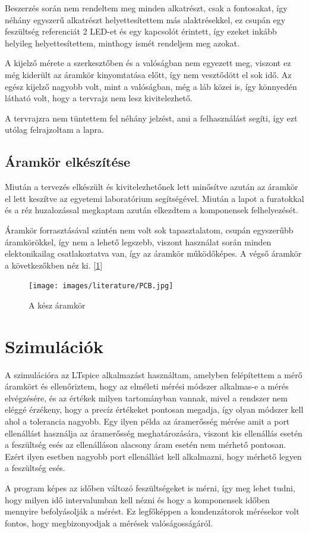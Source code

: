 Beszerzés során nem rendeltem meg minden alkatrészt, csak a fontosakat, így néhány
egyszerű alkatrészt helyettesítettem más alaktrésekkel, ez csupán egy feszültség referenciát
2 LED-et és egy kapcsolót érintett, így ezeket inkább helyileg helyettesítettem, minthogy
ismét rendeljem meg azokat.

A kijelző mérete a szerkesztőben és a valóságban nem egyezett meg, viszont ez még 
kiderült az áramkör kinyomtatása előtt, így nem vesztődött el sok idő. Az egész
kijelző nagyobb volt, mint a valóságban, még a láb közei is, így könnyedén látható
volt, hogy a tervrajz nem lesz kivitelezhető.

A tervrajzra nem tüntettem fel néhány jelzést, ami a felhasználást segíti, így ezt 
utólag felrajzoltam a lapra.

\subsection{Áramkör elkészítése}

Miután a tervezés elkészült és kivitelezhetőnek lett minősítve azután az áramkör
el lett keszítve az egyetemi laboratórium segítségével. Miután a lapot a furatokkal és a réz
huzalozással megkaptam azután elkezdtem a komponensek felhelyezését.

Áramkör forrasztásával szintén nem volt sok tapasztalatom, csupán egyszerűbb
áramkörökkel, így nem a lehető legszebb, viszont használat során minden elektonikailag
csatlakoztatva van, így az áramkör működőképes. A végső áramkör a következőkben néz ki.
[\ref{fig:Aramkor}]


\begin{figure}[h]
    \centering
    \texttt{[image: images/literature/PCB.jpg]}
    \caption{A kész áramkör}
    \label{fig:Aramkor}
\end{figure}

\section{Szimulációk}

A szimulációra az LTspice \cite{LTspice} alkalmazást használtam, 
amelyben felépítettem a mérő áramkört és ellenőriztem, hogy az elméleti
mérési módszer alkalmas-e a mérés elvégzésére, és az értékek milyen
tartományban vannak, mivel a rendszer nem eléggé érzékeny, hogy a precíz
értékeket pontosan megadja, így olyan módszer kell ahol a tolerancia nagyobb.
Egy ilyen példa az áramerősség mérése amit a port ellenállást használja az
áramerősség meghatározására, viszont kis ellenállás esetén a
feszültség esés az ellenálláson alacsony áram esetén nem mérhető pontosan.
Ezért ilyen esetben nagyobb port ellenállást kell alkalmazni, hogy mérhető 
legyen a feszültség esés.

A program képes az időben változó feszültségeket is mérni, így
meg lehet tudni, hogy milyen idő intervalumban kell nézni és hogy
a komponensek időben mennyire befolyásolják a mérést. Ez 
legfőképpen a kondenzátorok mérésekor volt fontos, hogy megbizonyodjak
a mérések valóságosságáról.


